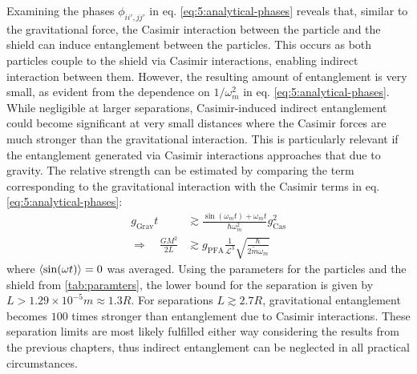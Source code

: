 Examining the phases $\phi_{ii',jj'}$ in eq. \eqref{eq:5:analytical-phases} reveals that, similar to the gravitational force, the Casimir interaction between the particle and the shield can induce entanglement between the particles. This occurs as both particles couple to the shield via Casimir interactions, enabling indirect interaction between them.
However, the resulting amount of entanglement is very small, as evident from the dependence on $1/\omega_m^2$ in eq. \eqref{eq:5:analytical-phases}.
While negligible at larger separations, Casimir-induced indirect entanglement could become significant at very small distances where the Casimir forces are much stronger than the gravitational interaction. 
This is particularly relevant if the entanglement generated via Casimir interactions approaches that due to gravity. 
The relative strength can be estimated by comparing the term corresponding to the gravitational interaction with the Casimir terms in eq. \eqref{eq:5:analytical-phases}:
\begin{align}
  g_\mathrm{Grav} t &\gtrsim \frac{\sin(\omega_m t) + \omega_m t}{\hbar \omega_m^2} g_\mathrm{Cas}^2 \\
  \Longrightarrow \quad 
  \frac{G M^2}{2L} &\gtrsim g_\mathrm{PFA} \frac{1}{\mathscr{L}^3} \sqrt{\frac{\hbar}{2\tilde{m}\omega_m}}
\end{align}
where $\left\langle\sin(\omega t)\right\rangle = 0$ was averaged.
Using the parameters for the particles and the shield from \cref{tab:paramters}, the lower bound for the separation is given by $L > 1.29\times 10^{-5}\si{m}\approx 1.3 R$. For separations $L \gtrsim 2.7R$, gravitational entanglement becomes $100$ times stronger than entanglement due to Casimir interactions.
These separation limits are most likely fulfilled either way considering the results from the previous chapters, thus indirect entanglement can be neglected in all practical circumstances.



